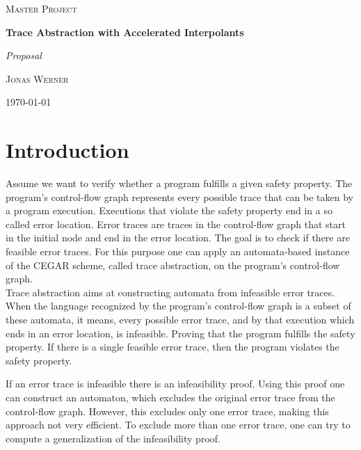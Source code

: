 \documentclass{article}
\begin{document}
	\newcommand{\HorizontalLine}{\rule{\linewidth}{0.3mm}}
	
		\begin{center}
		{\scshape\Large Master Project \par}
		\vspace{1.5cm}
		{\huge\bfseries Trace Abstraction with Accelerated Interpolants \par}
		{\Huge\itshape Proposal \par}
		\vspace{1cm}
		{\large \scshape Jonas Werner\par}
		\vspace{0.5cm}
		{\today \vspace{2cm}} 
		
		\end{center}

\section{Introduction}
Assume we want to verify whether a program fulfills a given safety property. The program's control-flow graph represents every possible trace that can be taken by a program execution. Executions that violate the safety property end in a so called error location. Error traces are traces in the control-flow graph that start in the initial node and end in the error location. The goal is to check if there are feasible error traces.
For this purpose one can apply an automata-based instance of the CEGAR scheme, called trace abstraction, on the program's control-flow graph. \\

Trace abstraction aims at constructing automata \cite{10.1007/978-3-642-39799-8_2} from infeasible error traces. When the language recognized by the program's control-flow graph is a subset of these automata, it means, every possible error trace, and by that execution which ends in an error location, is infeasible. Proving that the program fulfills the safety property. If there is a single feasible error trace, then the program violates the safety property.\\
\par 
If an error trace is infeasible there is an infeasibility proof. Using this proof one can construct an automaton, which excludes the original error trace from the control-flow graph. However, this excludes only one error trace, making this approach not very efficient. To exclude more than one error trace, one can try to compute a generalization of the infeasibility proof. \par
\end{document}
